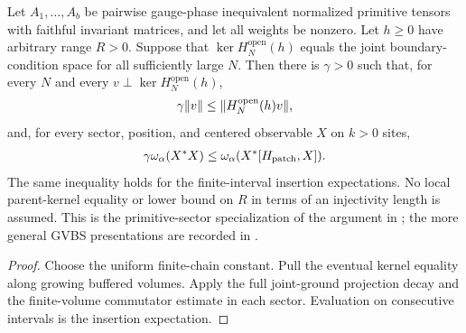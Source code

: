 \begin{lemma}
    \label{thm:eventual_kernel_sector_local_gap}
    \leanok
    Let $A_1,\ldots,A_b$ be pairwise gauge-phase inequivalent normalized
    primitive tensors with faithful invariant matrices, and let all weights
    be nonzero. Let $h\geq0$ have arbitrary range $R>0$. Suppose that
    $\ker H_N^{\mathrm{open}}(h)$ equals the joint boundary-condition space
    for all sufficiently large $N$. Then there is $\gamma>0$ such that, for every $N$ and every
    $v\perp\ker H_N^{\mathrm{open}}(h)$,
    \begin{align}
        \gamma\lVert v\rVert\leq\lVert H_N^{\mathrm{open}}(h)v\rVert,
        \notag
    \end{align}
    and, for every sector, position, and centered observable $X$ on $k>0$
    sites,
    \begin{align}
        \gamma\omega_\alpha(X^*X)
        \leq\omega_\alpha(X^*[H_{\mathrm{patch}},X]).
        \notag
    \end{align}
    The same inequality holds for the finite-interval insertion expectations.
    No local parent-kernel equality or lower bound on $R$ in terms of an
    injectivity length is assumed. This is the primitive-sector specialization
    of the argument in \cite[Theorem~1.2 and Section~6]{Nachtergaele1996Spectral};
    the more general GVBS presentations are recorded in
    \cite{gap:nachtergaele96_infinite_volume_ground_projection}.
\end{lemma}
\begin{proof}\leanok
    Choose the uniform finite-chain constant. Pull the eventual kernel
    equality along growing buffered volumes. Apply the full joint-ground
    projection decay and the finite-volume commutator estimate in each sector.
    Evaluation on consecutive intervals is the insertion expectation.
\end{proof}

